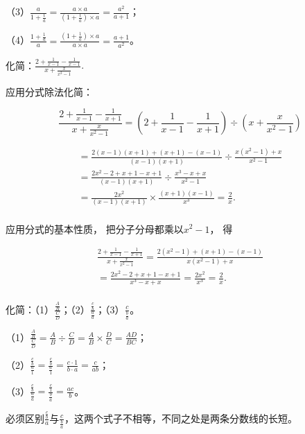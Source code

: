 （3）\(\frac{a}{1 + \frac{1}{a}} = \frac{a \times a}{\left(1 + \frac{1}{a}\right) \times a} = \frac{a^2}{a + 1}\)；

（4）\(\frac{1 + \frac{1}{a}}{a} = \frac{\left(1 + \frac{1}{a}\right) \times a}{a \times a} = \frac{a + 1}{a^2}\)。

化简：\(\frac{2 + \frac{1}{x - 1} - \frac{1}{x - 1}}{x + \frac{x}{x^2 - 1}}.\)

 应用分式除法化简：

\[
\frac{2 + \frac{1}{x - 1} - \frac{1}{x + 1}}{x + \frac{x}{x ^{2} - 1}} = \left(2 + \frac{1}{x - 1} - \frac{1}{x + 1}\right) \div \left(x + \frac{x}{x ^{2} - 1}\right)
\]

\[
\begin{array}{l} = \frac{2 (x - 1) (x + 1) + (x + 1) - (x - 1)}{(x - 1) (x + 1)} \div \frac{x \left(x ^{2} - 1\right) + x}{x ^{2} - 1} \\ = \frac{2 x ^{2} - 2 + x + 1 - x + 1}{(x - 1) (x + 1)} \div \frac{x ^{3} - x + x}{x ^{2} - 1} \\ = \frac{2 x ^{2}}{(x - 1) (x + 1)} \times \frac{(x + 1) (x - 1)}{x ^{3}} = \frac{2}{x}. \\ \end{array}
\]

 应用分式的基本性质， 把分子分母都乘以\(x^{2} - 1\)， 得

\[
\begin{array}{l} \frac{2 + \frac{1}{x - 1} - \frac{1}{x + 1}}{x + \frac{x}{x ^{2} - 1}} = \frac{2 (x ^{2} - 1) + (x + 1) - (x - 1)}{x (x ^{2} - 1) + x} \\ = \frac{2 x ^{2} - 2 + x + 1 - x + 1}{x ^{3} - x + x} = \frac{2 x ^{2}}{x ^{3}} = \frac{2}{x}. \\ \end{array}
\]

化简：（1）\(\frac{\frac{A}{B}}{\frac{C}{D}}\)；（2）\(\frac{\frac{c}{b}}{\frac{a}{a}}\)；（3）\(\frac{c}{\frac{b}{a}}\)。

（1）\(\frac{\frac{A}{B}}{\frac{C}{D}} = \frac{A}{B} \div \frac{C}{D} = \frac{A}{B} \times \frac{D}{C} = \frac{AD}{BC}\)；

（2）\(\frac{\frac{c}{b}}{\frac{a}{1}} = \frac{\frac{c}{b}}{\frac{a}{1}} = \frac{c \cdot 1}{b \cdot a} = \frac{c}{ab}\)；

（3）\(\frac{\frac{c}{b}}{\frac{a}{a}} = \frac{\frac{c}{1}}{\frac{b}{a}} = \frac{ac}{b}\)。

必须区别\(\frac{\frac{c}{b}}{a}\)与\(\frac{c}{\frac{b}{a}}\)，这两个式子不相等，不同之处是两条分数线的长短。

